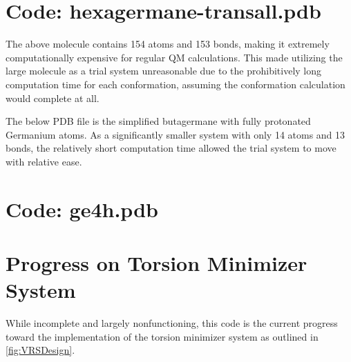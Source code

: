\section{Code: hexagermane-transall.pdb}



The above molecule contains 154 atoms and 153 bonds, making it extremely computationally expensive for regular QM calculations. This made utilizing the large molecule as a trial system unreasonable due to the prohibitively long computation time for each conformation, assuming the conformation calculation would complete at all.

The below PDB file is the simplified butagermane with fully protonated Germanium atoms. As a significantly smaller system with only 14 atoms and 13 bonds, the relatively short computation time allowed the trial system to move with relative ease.

\section{Code: ge4h.pdb}



\section{Progress on Torsion Minimizer System}

While incomplete and largely nonfunctioning, this code is the current progress toward the implementation of the torsion minimizer system as outlined in \ref{fig:VRSDesign}.


